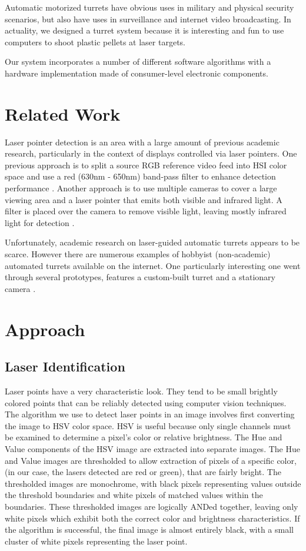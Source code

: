 \documentclass[10pt,twocolumn,letterpaper]{article}
\begin{document}
Automatic motorized turrets have obvious uses in military and physical security scenarios, but also have uses in surveillance and internet video broadcasting.  In actuality, we designed a turret system because it is interesting and fun to use computers to shoot plastic pellets at laser targets.

Our system incorporates a number of different software algorithms with a hardware implementation made of consumer-level electronic components.

\section{Related Work}

Laser pointer detection is an area with a large amount of previous academic research, particularly in the context of displays controlled via laser pointers.  One previous approach is to split a source RGB reference video feed into HSI color space and use a red (630nm - 650nm) band-pass filter to enhance detection performance \cite{DBLP:conf/hci/KimLLL07}.  Another approach is to use multiple cameras to cover a large viewing area and a laser pointer that emits both visible and infrared light.  A filter is placed over the camera to remove visible light, leaving mostly infrared light for detection \cite{König200715925196}.

Unfortunately, academic research on laser-guided automatic turrets appears to be scarce.  However there are numerous examples of hobbyist (non-academic) automated turrets available on the internet.  One particularly interesting one went through several prototypes, features a custom-built turret and a stationary camera \cite{defcon}.

\section{Approach}

\subsection{Laser Identification}

Laser points have a very characteristic look. They tend to be small brightly colored points that can be reliably detected using computer vision techniques. The algorithm we use to detect laser points in an image involves first converting the image to HSV color space. HSV is useful because only single channels must be examined to determine a pixel's color or relative brightness. The Hue and Value components of the HSV image are extracted into separate images. The Hue and Value images are thresholded to allow extraction of pixels of a specific color, (in our case, the lasers detected are red or green), that are fairly bright.  The thresholded images are monochrome, with black pixels representing values outside the threshold boundaries and white pixels of matched values within the boundaries.  These thresholded images are logically ANDed together, leaving only white pixels which exhibit both the correct color and brightness characteristics.  If the algorithm is successful, the final image is almost entirely black, with a small cluster of white pixels representing the laser point.
\end{document}
